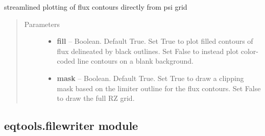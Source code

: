 \documentclass[letterpaper,10pt,english]{sphinxmanual}
\begin{document}
\begin{fulllineitems}

\begin{fulllineitems}
\label{eqtools:eqtools.eqdskreader.EqdskReader.gfile}
\end{fulllineitems}


\begin{fulllineitems}
\label{eqtools:eqtools.eqdskreader.EqdskReader.plotFlux}
streamlined plotting of flux contours directly from psi grid
\begin{quote}\begin{description}
\item[{Parameters}] \leavevmode\begin{itemize}
\item {} 
\textbf{fill} -- Boolean.
Default True.  Set True to plot filled contours of flux delineated by black outlines.
Set False to instead plot color-coded line contours on a blank background.

\item {} 
\textbf{mask} -- Boolean.
Default True.  Set True to draw a clipping mask based on the limiter outline for the flux contours.
Set False to draw the full RZ grid.

\end{itemize}

\end{description}\end{quote}

\end{fulllineitems}


\end{fulllineitems}



\subsection{eqtools.filewriter module}
\label{eqtools:module-eqtools.filewriter}\label{eqtools:eqtools-filewriter-module}

\begin{fulllineitems}
\label{eqtools:eqtools.filewriter.gfile}
\end{fulllineitems}
\end{document}
